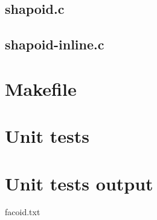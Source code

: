 \subsection{shapoid.c}

\begin{scriptsize}
\begin{ttfamily}

\end{ttfamily}
\end{scriptsize}

\subsection{shapoid-inline.c}

\begin{scriptsize}
\begin{ttfamily}

\end{ttfamily}
\end{scriptsize}

\section{Makefile}

\begin{scriptsize}
\begin{ttfamily}

\end{ttfamily}
\end{scriptsize}

\section{Unit tests}

\begin{scriptsize}
\begin{ttfamily}

\end{ttfamily}
\end{scriptsize}

\section{Unit tests output}

\begin{scriptsize}
\begin{ttfamily}

\end{ttfamily}
\end{scriptsize}

facoid.txt

\begin{scriptsize}
\begin{ttfamily}

\end{ttfamily}
\end{scriptsize}

